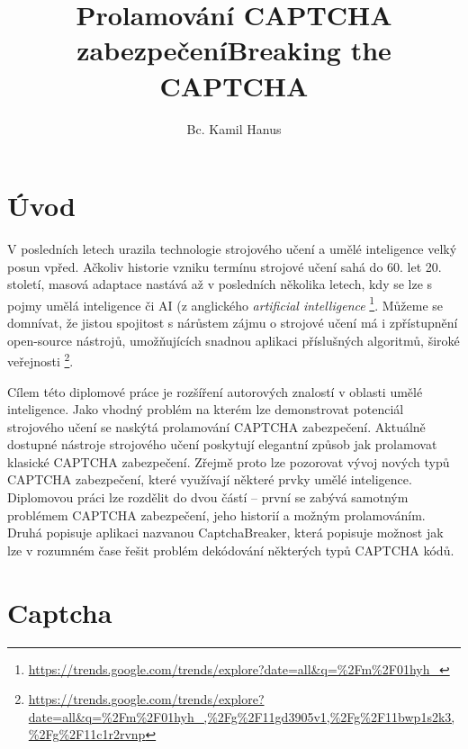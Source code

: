 \documentclass[
  master=true,
  biblatex,
  glossaries,
  index
]{kidiplom}
\title{Prolamování CAPTCHA zabezpečení}
\title[english]{Breaking the CAPTCHA}
\author{Bc. Kamil Hanus}
\begin{document}
\maketitle



\newcommand{\BibLaTeX}{\textsc{Bib}\LaTeX}
\renewcommand\UrlFont{}



\section{Úvod}
V posledních letech urazila technologie strojového učení a umělé inteligence velký posun vpřed. Ačkoliv historie vzniku termínu strojové učení sahá do  60. let 20. století, masová adaptace nastává až v posledních několika letech, kdy se lze s pojmy umělá inteligence či AI (z anglického \textit{artificial intelligence} \footnote{\url{https://trends.google.com/trends/explore?date=all\&q=\%2Fm\%2F01hyh\_}}. Můžeme se domnívat, že jistou spojitost s nárůstem zájmu o strojové učení má i zpřístupnění open-source nástrojů, umožňujících snadnou aplikaci příslušných algoritmů, široké veřejnosti \footnote{\url{https://trends.google.com/trends/explore?date=all\&q=\%2Fm\%2F01hyh\_,\%2Fg\%2F11gd3905v1,\%2Fg\%2F11bwp1s2k3,\%2Fg\%2F11c1r2rvnp}}.

Cílem této diplomové práce je  rozšíření autorových znalostí v oblasti umělé inteligence. Jako vhodný problém na kterém lze demonstrovat potenciál strojového učení se naskýtá prolamování CAPTCHA zabezpečení. Aktuálně dostupné nástroje strojového učení poskytují elegantní způsob jak prolamovat klasické CAPTCHA zabezpečení. Zřejmě proto lze pozorovat vývoj nových typů CAPTCHA zabezpečení, které využívají některé prvky umělé inteligence. Diplomovou práci lze rozdělit do dvou částí -- první se zabývá samotným problémem CAPTCHA zabezpečení, jeho historií a možným prolamováním. Druhá popisuje aplikaci nazvanou CaptchaBreaker, která popisuje možnost jak lze v rozumném čase řešit problém dekódování některých typů CAPTCHA kódů.
\newpage
\section{Captcha}
\end{document}
